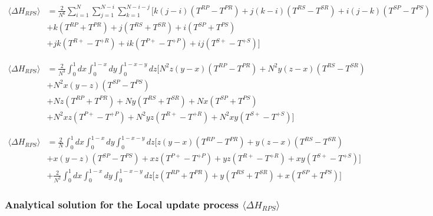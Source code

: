 \documentclass[./main.tex]{subfiles}
\begin{document}
\begin{equation} 
\begin{aligned}
  \langle \Delta H_{RPS} \rangle &= \frac{2}{N^6} \sum_{i=1}^{N}\sum_{j=1}^{N-i}\sum_{k=1}^{N-i-j}
  \Big[k(j-i)(T^{RP} - T^{PR}) + j(k-i)(T^{RS} - T^{SR}) + i(j-k)(T^{SP} - T^{PS})\nonumber \\
  &+ k(T^{RP} + T^{PR}) + j(T^{RS} + T^{SR}) + i(T^{SP} + T^{PS})\nonumber \\
  &+ jk(T^{R+} - T^{+R}) + ik(T^{P+} - T^{+P}) + ij(T^{S+} - T^{+S})\nonumber
  \Big]
\end{aligned}
\end{equation}



\begin{equation} \nonumber
\begin{aligned}
  \langle \Delta H_{RPS} \rangle &= \frac{2}{N^3} \int_{0}^{1}dx \int_{0}^{1-x} dy \int_{0}^{1-x-y}dz 
  \Big[N^2z(y-x)(T^{RP} - T^{PR}) + N^2y(z-x)(T^{RS} - T^{SR})\nonumber \\
  &+ N^2x(y-z)(T^{SP} - T^{PS}) \nonumber\\
  &+ Nz(T^{RP} + T^{PR}) + Ny(T^{RS} + T^{SR}) + Nx(T^{SP} + T^{PS}) \nonumber\\
  &+ N^2xz(T^{P+} - T^{+P}) + N^2yz(T^{R+} - T^{+R}) + N^2xy(T^{S+} - T^{+S})
  \Big]\nonumber
\end{aligned}
\end{equation}

\begin{equation}
\begin{aligned}
  \langle \Delta H_{RPS} \rangle &= \frac{2}{N} \int_{0}^{1}dx \int_{0}^{1-x} dy \int_{0}^{1-x-y}dz 
  \Big[z(y-x)(T^{RP} - T^{PR}) + y(z-x)(T^{RS} - T^{SR}) \nonumber\\
  &+ x(y-z)(T^{SP} - T^{PS}) + xz(T^{P+} - T^{+P})+ yz(T^{R+} - T^{+R}) + xy(T^{S+} - T^{+S})
  \Big] \nonumber\\
  &+ \frac{2}{N^2} \int_{0}^{1}dx \int_{0}^{1-x} dy \int_{0}^{1-x-y}dz\Big[
  z(T^{RP} + T^{PR}) + y(T^{RS} + T^{SR}) + x(T^{SP} + T^{PS})\Big]\nonumber
\end{aligned}
\end{equation}


\subsubsection{Analytical solution for the Local update process $\langle \Delta H_{RPS} \rangle$}
\end{document}
